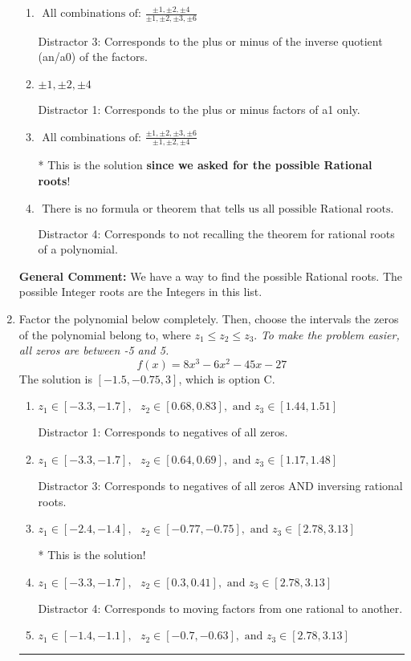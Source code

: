 \documentclass{extbook}[14pt]
\newcommand{\litem}[1]{\item #1

\rule{\textwidth}{0.4pt}}
\begin{document}
\begin{enumerate}
{\begin{enumerate}[label=\Alph*.]
This would have been the solution \textbf{if asked for the possible Integer roots}!
\item \( \text{ All combinations of: }\frac{\pm 1,\pm 2,\pm 4}{\pm 1,\pm 2,\pm 3,\pm 6} \)

 Distractor 3: Corresponds to the plus or minus of the inverse quotient (an/a0) of the factors. 
\item \( \pm 1,\pm 2,\pm 4 \)

 Distractor 1: Corresponds to the plus or minus factors of a1 only.
\item \( \text{ All combinations of: }\frac{\pm 1,\pm 2,\pm 3,\pm 6}{\pm 1,\pm 2,\pm 4} \)

* This is the solution \textbf{since we asked for the possible Rational roots}!
\item \( \text{ There is no formula or theorem that tells us all possible Rational roots.} \)

 Distractor 4: Corresponds to not recalling the theorem for rational roots of a polynomial.
\end{enumerate}

\textbf{General Comment:} We have a way to find the possible Rational roots. The possible Integer roots are the Integers in this list.
}
\litem{
Factor the polynomial below completely. Then, choose the intervals the zeros of the polynomial belong to, where $z_1 \leq z_2 \leq z_3$. \textit{To make the problem easier, all zeros are between -5 and 5.}
\[ f(x) = 8x^{3} -6 x^{2} -45 x -27 \]The solution is \( [-1.5, -0.75, 3] \), which is option C.\begin{enumerate}[label=\Alph*.]
\item \( z_1 \in [-3.3, -1.7], \text{   }  z_2 \in [0.68, 0.83], \text{   and   } z_3 \in [1.44, 1.51] \)

 Distractor 1: Corresponds to negatives of all zeros.
\item \( z_1 \in [-3.3, -1.7], \text{   }  z_2 \in [0.64, 0.69], \text{   and   } z_3 \in [1.17, 1.48] \)

 Distractor 3: Corresponds to negatives of all zeros AND inversing rational roots.
\item \( z_1 \in [-2.4, -1.4], \text{   }  z_2 \in [-0.77, -0.75], \text{   and   } z_3 \in [2.78, 3.13] \)

* This is the solution!
\item \( z_1 \in [-3.3, -1.7], \text{   }  z_2 \in [0.3, 0.41], \text{   and   } z_3 \in [2.78, 3.13] \)

 Distractor 4: Corresponds to moving factors from one rational to another.
\item \( z_1 \in [-1.4, -1.1], \text{   }  z_2 \in [-0.7, -0.63], \text{   and   } z_3 \in [2.78, 3.13] \)


\end{enumerate}}
\end{enumerate}
\end{document}
